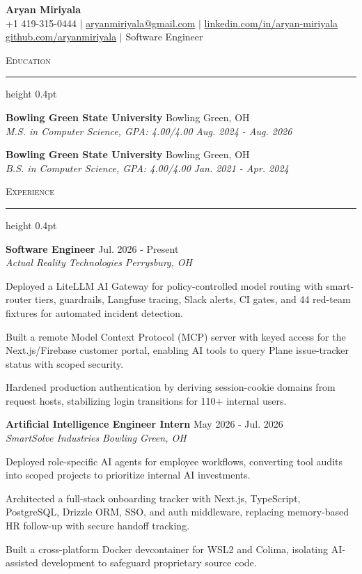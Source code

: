 \documentclass[letterpaper,11pt]{article}
\newcommand{\resumesection}[1]{%
  \par\vspace{2pt}%
  {\large\scshape #1}\par\vspace{2pt}%
  \hrule height 0.4pt\vspace{2pt}%
}
\newcommand{\resumeSubheading}[4]{
  \textbf{#1} \hfill #2\\
  \textit{#3} \hfill \textit{#4}
}
\begin{document}
\begin{center}
  {\LARGE \textbf{Aryan Miriyala}}\\[2pt]
  \small
  +1 419-315-0444 $|$ \href{mailto:aryanmiriyala@gmail.com}{aryanmiriyala@gmail.com} $|$ \href{https://www.linkedin.com/in/aryan-miriyala-7788a21b6/}{linkedin.com/in/aryan-miriyala}\\
  \href{https://github.com/aryanmiriyala}{github.com/aryanmiriyala} $|$ Software Engineer
\end{center}\vspace{-6pt}

\resumesection{Education}
\resumeSubheading
{Bowling Green State University}{Bowling Green, OH}
{M.S. in Computer Science, GPA: 4.00/4.00}{Aug. 2024 - Aug. 2026}

\resumeSubheading
{Bowling Green State University}{Bowling Green, OH}
{B.S. in Computer Science, GPA: 4.00/4.00}{Jan. 2021 - Apr. 2024}

\resumesection{Experience}
\resumeSubheading
{Software Engineer}{Jul. 2026 - Present}
{Actual Reality Technologies}{Perrysburg, OH}
\begin{tightitemize}
  \item Deployed a LiteLLM AI Gateway for policy-controlled model routing with smart-router tiers, guardrails, Langfuse tracing, Slack alerts, CI gates, and 44 red-team fixtures for automated incident detection.
  \item Built a remote Model Context Protocol (MCP) server with keyed access for the Next.js/Firebase customer portal, enabling AI tools to query Plane issue-tracker status with scoped security.
  \item Hardened production authentication by deriving session-cookie domains from request hosts, stabilizing login transitions for 110+ internal users.
\end{tightitemize}

\resumeSubheading
{Artificial Intelligence Engineer Intern}{May 2026 - Jul. 2026}
{SmartSolve Industries}{Bowling Green, OH}
\begin{tightitemize}
  \item Deployed role-specific AI agents for employee workflows, converting tool audits into scoped projects to prioritize internal AI investments.
  \item Architected a full-stack onboarding tracker with Next.js, TypeScript, PostgreSQL, Drizzle ORM, SSO, and auth middleware, replacing memory-based HR follow-up with secure handoff tracking.
  \item Built a cross-platform Docker devcontainer for WSL2 and Colima, isolating AI-assisted development to safeguard proprietary source code.
\end{tightitemize}
\end{document}
